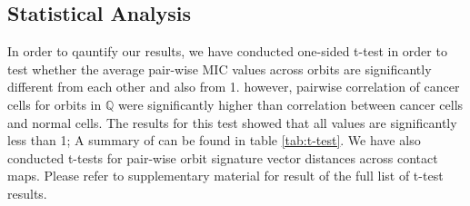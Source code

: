 \documentclass[a4,center,fleqn]{NAR}
\begin{document}
\subsection{Statistical Analysis}
In order to qauntify our results, we have conducted one-sided
t-test in order to test whether the average pair-wise
MIC values across orbits are significantly different from 
each other and also from 1. 
however, pairwise correlation of cancer cells for
orbits in $\mathbb{Q}$ were significantly higher than
correlation between cancer cells and normal cells.
The results
for this test showed that all values are significantly less than 1;
A summary of can be found in
table \ref{tab:t-test}.
We have also conducted t-tests for 
pair-wise orbit signature vector distances across contact maps.
Please refer to supplementary material for result of the 
full list of t-test results.
\end{document}
